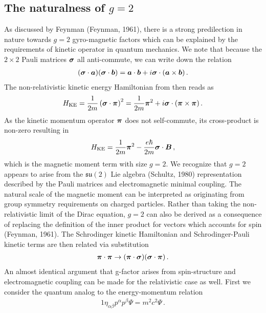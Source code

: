 \subsection{The naturalness of $g=2$}
\label{sec:nat}
As discussed by Feynman (Feynman, 1961), there is a strong predilection in nature towards $g=2$ gyro-magnetic factors which can be explained by the requirements of kinetic operator in quantum mechanics. We note that because the $2\times2$ Pauli matrices $\boldsymbol{\sigma}$ all anti-commute, we can write down the relation
\begin{alignat}{1}
	\label{nat:1} (\boldsymbol{\sigma}\cdot\boldsymbol{a})(\boldsymbol{\sigma}\cdot\boldsymbol{b})=\boldsymbol{a}\cdot\boldsymbol{b}+i\boldsymbol{\sigma}\cdot(\boldsymbol{a}\times\boldsymbol{b})\,.
\end{alignat}
The non-relativistic kinetic energy Hamiltonian from  then reads as
\begin{alignat}{1}
	\label{nat:2} {H}_{\mathrm{KE}}=\frac{1}{2m}\left(\boldsymbol{\sigma}\cdot\boldsymbol{\pi}\right)^{2}=\frac{1}{2m}\boldsymbol{\pi}^{2}+i\boldsymbol{\sigma}\cdot(\boldsymbol{\pi}\times\boldsymbol{\pi})\,.
\end{alignat}
As the kinetic momentum operator $\boldsymbol{\pi}$ does not self-commute, its cross-product is non-zero resulting in
\begin{alignat}{1}
	\label{nat:3} {H}_{\mathrm{KE}}=\frac{1}{2m}\boldsymbol{\pi}^{2}-\frac{e\hbar}{2m}\boldsymbol{\sigma}\cdot\boldsymbol{B}\,,
\end{alignat}
which is the magnetic moment term with size $g=2$. We recognize that $g=2$ appears to arise from the $\mathfrak{su}(2)$ Lie algebra (Schultz, 1980) representation described by the Pauli matrices and electromagnetic minimal coupling. The natural scale of the magnetic moment can be interpreted as originating from group symmetry requirements on charged particles. Rather than taking the non-relativistic limit of the Dirac equation, $g=2$ can also be derived as a consequence of replacing the definition of the inner product for vectors which accounts for spin (Feynman, 1961). The Schrodinger kinetic Hamiltonian and Schrodinger-Pauli kinetic terms are then related via substitution
\begin{alignat}{1}
	\label{nat:4} \boldsymbol{\pi}\cdot\boldsymbol{\pi} \rightarrow (\boldsymbol{\pi}\cdot\boldsymbol{\sigma})(\boldsymbol{\sigma}\cdot\boldsymbol{\pi})\,.
\end{alignat}
An almost identical argument that g-factor arises from spin-structure and electromagnetic coupling can be made for the relativistic case as well. First we consider the quantum analog to the energy-momentum relation
\begin{alignat}{1}
	\label{analog:1} \eta_{\alpha\beta}p^{\alpha}p^{\beta}\Psi=m^{2}c^{2}\Psi\,.
\end{alignat}
